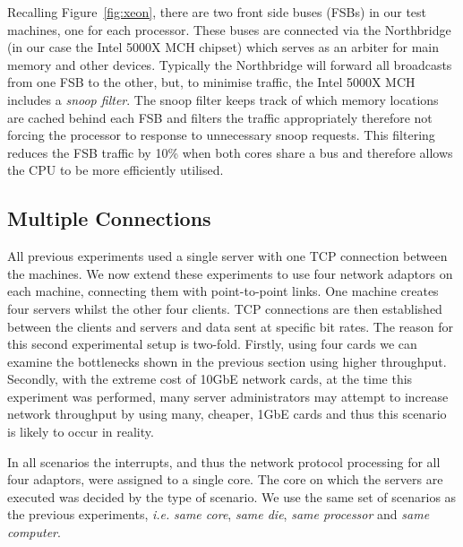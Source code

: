 \documentclass[conference, compsoc]{IEEEtran}
\begin{document}
Recalling Figure~\ref{fig:xeon}, there are two front side buses (FSBs) in our test machines, one for each processor. These buses are connected via the Northbridge (in our case the Intel 5000X MCH chipset) which serves as an arbiter for main memory and other devices. Typically the Northbridge will forward all broadcasts from one FSB to the other, but, to minimise traffic, the Intel 5000X MCH includes a \emph{snoop filter}. The snoop filter keeps track of which memory locations are cached behind each FSB and filters the traffic appropriately therefore not forcing the processor to response to unnecessary snoop requests. This filtering reduces the FSB traffic by 10\% when both cores share a bus and therefore allows the CPU to be more efficiently utilised.


\subsection{Multiple Connections}
\label{sect:multipleconnections}

All previous experiments used a single server with one TCP connection between the machines. We now extend these experiments to use four network adaptors on each machine, connecting them with point-to-point links. One machine creates four servers whilst the other four clients. TCP connections are then established between the clients and servers and data sent at specific bit rates. The reason for this second experimental setup is two-fold. Firstly, using four cards we can examine the bottlenecks shown in the previous section using higher throughput. Secondly, with the extreme cost of 10GbE network cards, at the time this experiment was performed, many server administrators may attempt to increase network throughput by using many, cheaper, 1GbE cards and thus this scenario is likely to occur in reality.

In all scenarios the interrupts, and thus the network protocol processing for all four adaptors, were assigned to a single core. The core on which the servers are executed was decided by the type of scenario. We use the same set of scenarios as the previous experiments, \emph{i.e.} \emph{same core}, \emph{same die}, \emph{same processor} and \emph{same computer}.
\end{document}
